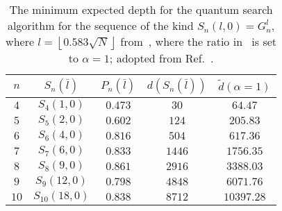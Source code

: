 \begin{table}[h!]
	\centering
	\caption[The minimum expected depth for the quantum search algorithm for the sequence of the kind ${S_{n}(l,0) = G_n^{l}}$.]{The minimum expected depth for the quantum search algorithm for the sequence of the kind ${S_{n}(l,0) = G_n^{l}}$, where ${l = \left\lfloor 0.583 \sqrt{N} \right\rfloor}$ from~\protect{}, where the ratio in~\protect{} is set to ${\alpha=1}$; adopted from Ref.~\cite{Zhang_2020}.}
	\begin{tabular}{ccccc}
		\toprule
		$n$ & $S_n(\bar{l})$ & $P_{n}(\bar{l})$ & $d\left(S_n(\bar{l})\right)$ & $\tilde{d}(\alpha = 1)$\\
		\toprule
		$4$  & $S_4(1,0)$     & $0.473$ & $30$   & $64.47$    \\
		$5$  & $S_5(2,0)$     & $0.602$ & $124$  & $205.83$   \\ 
		$6$  & $S_6(4,0)$     & $0.816$ & $504$  & $617.36$   \\
		$7$  & $S_7(6,0)$     & $0.833$ & $1446$ & $1756.35$  \\
		$8$  & $S_8(9,0)$     & $0.861$ & $2916$ & $3388.03$  \\
		$9$  & $S_9(12,0)$    & $0.798$ & $4848$ & $6071.76$  \\
		$10$ & $S_{10}(18,0)$ & $0.838$ & $8712$ & $10397.28$ \\
		\toprule
	\end{tabular}
\end{table}

\bigskip
\bigskip

